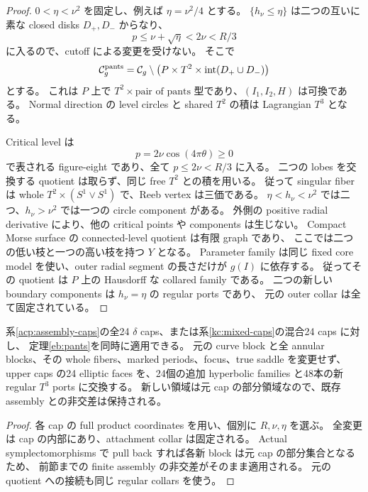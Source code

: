 \begin{proof}
$0<\eta<\nu^2$ を固定し、例えば $\eta=\nu^2/4$ とする。
$\{h_\nu\le\eta\}$ は二つの互いに素な closed disks $D_+,D_-$ からなり、
\[
 p\le\nu+\sqrt\eta<2\nu<R/3
\]
に入るので、cutoff による変更を受けない。
そこで
\begin{equation}\label{eb:pants-domain}
 \mathcal C_g^{\rm pants}
 =\mathcal C_g\setminus
  \bigl(P\times T^2\times\operatorname{int}(D_+\cup D_-)\bigr)
\end{equation}
とする。
これは $P$ 上で $T^2\times\text{pair of pants}$ 型であり、$(I_1,I_2,H)$ は可換である。
Normal direction の level circles と shared $T^2$ の積は Lagrangian $T^3$ となる。

Critical level は
\begin{equation}\label{eb:lemniscate}
 p=2\nu\cos(4\pi\theta)\ge0
\end{equation}
で表される figure-eight であり、全て $p\le2\nu<R/3$ に入る。
二つの lobes を交換する quotient は取らず、同じ free $T^2$ との積を用いる。
従って singular fiber は whole $T^2\times(S^1\vee S^1)$ で、Reeb vertex は三価である。
$\eta<h_\nu<\nu^2$ では二つ、$h_\nu>\nu^2$ では一つの circle component がある。
外側の positive radial derivative により、他の critical points や components は生じない。
Compact Morse surface の connected-level quotient は有限 graph であり、
ここでは二つの低い枝と一つの高い枝を持つ $Y$ となる。
Parameter family は同じ fixed core model を使い、outer radial segment の長さだけが $g(I)$ に依存する。
従ってその quotient は $P$ 上の Hausdorff な collared family である。
二つの新しい boundary components は $h_\nu=\eta$ の regular ports であり、
元の outer collar は全て固定されている。
\end{proof}

\begin{corollary}[24か所の同時交換]\label{eb:all24}
系\ref{acp:assembly-caps}の全24 $\delta$ caps、または系\ref{kc:mixed-caps}の混合24 caps に対し、
定理\ref{eb:pants}を同時に適用できる。
元の curve block と全 annular blocks、その whole fibers、marked periods、focus、true saddle を変更せず、
upper caps の24 elliptic faces を、24個の追加 hyperbolic families と48本の新 regular $T^3$ ports に交換する。
新しい領域は元 cap の部分領域なので、既存 assembly との非交差は保持される。
\end{corollary}

\begin{proof}
各 cap の full product coordinates を用い、個別に $R,\nu,\eta$ を選ぶ。
全変更は cap の内部にあり、attachment collar は固定される。
Actual symplectomorphisms で pull back すれば各新 block は元 cap の部分集合となるため、
前節までの finite assembly の非交差がそのまま適用される。
元の quotient への接続も同じ regular collars を使う。
\end{proof}

